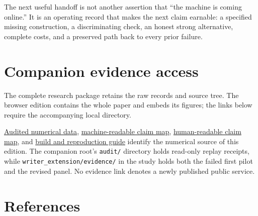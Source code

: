 The next useful handoff is not another assertion that ``the machine is
coming online.'' It is an operating record that makes the next claim
earnable: a specified missing construction, a discriminating check, an
honest strong alternative, complete costs, and a preserved path back to
every prior failure.

\section*{Companion evidence access}\label{evidence-access}

The complete research package retains the raw records and source tree.
The browser edition contains the whole paper and embeds its figures; the
links below require the accompanying local directory.

\href{https://github.com/MontrealAI/AGI-Alpha-Agent-v0/blob/60e4f476b741318278a91e128205cddf27e971bb/docs/reports/invention-automation-research-v1/data/audited.json}{Audited numerical data},
\href{https://github.com/MontrealAI/AGI-Alpha-Agent-v0/blob/60e4f476b741318278a91e128205cddf27e971bb/docs/reports/invention-automation-research-v1/claim-map.json}{machine-readable claim map},
\href{https://github.com/MontrealAI/AGI-Alpha-Agent-v0/blob/60e4f476b741318278a91e128205cddf27e971bb/docs/reports/invention-automation-research-v1/claim-map.md}{human-readable claim map}, and
\href{https://github.com/MontrealAI/AGI-Alpha-Agent-v0/blob/60e4f476b741318278a91e128205cddf27e971bb/docs/reports/invention-automation-research-v1/BUILD.md}{build and reproduction guide} identify the numerical
source of this edition. The companion root's \texttt{audit/} directory
holds read-only replay receipts, while
\texttt{writer\_extension/evidence/} in the study holds both the failed
first pilot and the revised panel. No evidence link denotes a newly
published public service.

\section*{References}\label{references}

